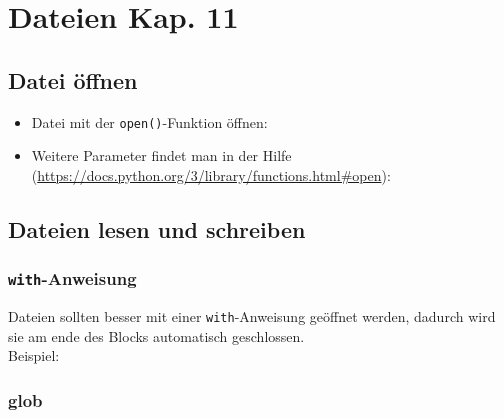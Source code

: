 %

%

%

\section[Dateien]{Dateien \tiny{Kap. 11}}

\subsection{Datei öffnen}
\begin{itemize}
	\item Datei mit der \texttt{open()}-Funktion öffnen:
	
	\item Weitere Parameter findet man in der Hilfe (\url{https://docs.python.org/3/library/functions.html#open}):
	
\end{itemize}

\subsection{Dateien lesen und schreiben}



\subsubsection{\texttt{with}-Anweisung}
Dateien sollten besser mit einer \texttt{with}-Anweisung geöffnet werden, dadurch wird sie am ende des Blocks automatisch geschlossen.\\
Beispiel:


\subsubsection{glob}


